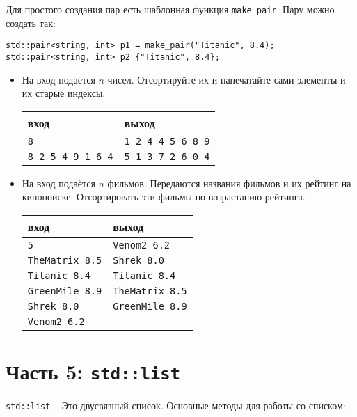 \documentclass{article}
\begin{document}
Для простого создания пар есть шаблонная функция \texttt{make\_pair}. Пару можно создать так:
\begin{lstlisting}
std::pair<string, int> p1 = make_pair("Titanic", 8.4);
std::pair<string, int> p2 {"Titanic", 8.4};
\end{lstlisting}

\begin{itemize}
\item На вход подаётся $n$ чисел. Отсортируйте их и напечатайте сами элементы и их старые индексы. 
\begin{center}
\begin{tabular}{ l | l }
 вход & выход \\ \hline
 \texttt{8} &                \texttt{1 2 4 4 5 6 8 9}  \\ 
 \texttt{8 2 5 4 9 1 6 4} &  \texttt{5 1 3 7 2 6 0 4}\\
\end{tabular}
\end{center}

\item На вход подаётся $n$ фильмов. Передаются названия фильмов и их рейтинг на кинопоиске. Отсортировать эти фильмы по возрастанию рейтинга.
\begin{center}
\begin{tabular}{ l | l }
 вход & выход \\ \hline
 \texttt{5}              & \texttt{Venom2 6.2}  \\ 
 \texttt{TheMatrix 8.5}  & \texttt{Shrek 8.0}  \\
 \texttt{Titanic 8.4}    & \texttt{Titanic 8.4}\\
 \texttt{GreenMile 8.9}  & \texttt{TheMatrix 8.5}\\
 \texttt{Shrek 8.0}      & \texttt{GreenMile 8.9}\\
 \texttt{Venom2 6.2}     &\\
\end{tabular}
\end{center}
\end{itemize}
\newpage
\section*{Часть 5: \texttt{std::list}}
\texttt{std::list} -- Это двусвязный список. Основные методы для работы со списком:
\end{document}
